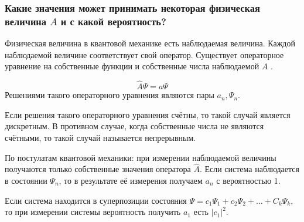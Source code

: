 \subsubsection{Какие значения может принимать некоторая физическая величина $A$ и с какой вероятность?
}


Физическая величина в квантовой механике есть наблюдаемая величина. Каждой наблюдаемой величине соответствует свой оператор. Существует операторное уравнение на собственные функции и собственные числа наблюдаемой $A$ .

$$\hat{A}\Psi=a\Psi$$
Решениями такого операторного уравнения являются пары $a_n,\Psi_n$. 

Если решения такого операторного уравнения счётны, то такой случай является дискретным. В противном случае, когда собственные числа не являются счётными, то такой случай называется непрерывным.

По постулатам квантовой механики: при измерении наблюдаемой величины получаются только собственные значения оператора $\hat{A}$. Если система наблюдается в состоянии $\Psi_n$,  то в результате её измерения получаем $a_n$ с вероятностью 1.

Если система находится в суперпозиции состояния $\Psi=c_1\Psi_1+c_2\Psi_2+\dots+C_k\Psi_k$, то при измерении системы вероятность получить $a_1$ есть $|c_1|^2$.